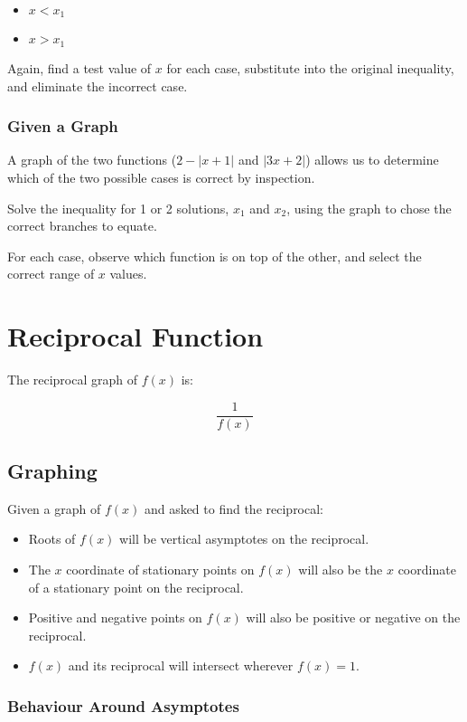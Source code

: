 \documentclass[a4paper,11pt]{article}
\begin{document}
\begin{itemize}
\item $x < x_1$
\item $x > x_1$
\end{itemize}

Again, find a test value of $x$ for each case, substitute into the original
inequality, and eliminate the incorrect case.


\subsubsection{Given a Graph}

A graph of the two functions ($2 - \lvert x + 1 \rvert$ and
$\lvert 3x + 2 \rvert$) allows us to determine which of the two possible cases
is correct by inspection.

Solve the inequality for 1 or 2 solutions, $x_1$ and $x_2$, using the graph to
chose the correct branches to equate.

For each case, observe which function is on top of the other, and select the
correct range of $x$ values.




\section{Reciprocal Function}

The reciprocal graph of $f(x)$ is:

$$
\frac{1}{f(x)}
$$


\subsection{Graphing}

Given a graph of $f(x)$ and asked to find the reciprocal:

\begin{itemize}
\item Roots of $f(x)$ will be vertical asymptotes on the reciprocal.
\item The $x$ coordinate of stationary points on $f(x)$ will also be the $x$
	coordinate of a stationary point on the reciprocal.
\item Positive and negative points on $f(x)$ will also be positive or negative
	on the reciprocal.
\item $f(x)$ and its reciprocal will intersect wherever $f(x) = 1$.
\end{itemize}


\subsubsection{Behaviour Around Asymptotes}
\end{document}

